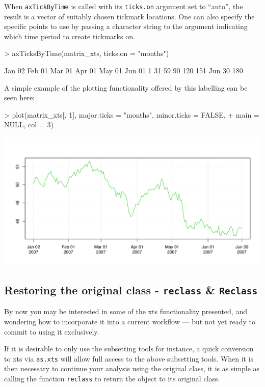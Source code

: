 \documentclass{article}
\begin{document}
When {\tt axTickByTime} is called with its
{\tt ticks.on} argument set to ``auto'', the result
is a vector of suitably chosen tickmark locations.
One can also specify the specific points to use
by passing a character string to the argument
indicating which time period to create tickmarks on.
\begin{Schunk}
\begin{Sinput}
> axTicksByTime(matrix_xts, ticks.on = "months")
\end{Sinput}
\begin{Soutput}
Jan 02 Feb 01 Mar 01 Apr 01 May 01 Jun 01 
           1           31           59           90          120          151 
Jun 30 
         180 
\end{Soutput}
\end{Schunk}
A simple example of the plotting functionality
offered by this labelling can be seen here:
\begin{center}
\begin{Schunk}
\begin{Sinput}
> plot(matrix_xts[, 1], major.ticks = "months", minor.ticks = FALSE, 
+     main = NULL, col = 3)
\end{Sinput}
\end{Schunk}
\includegraphics{xts-xtsplot}
\end{center}

\subsection{Restoring the original class - {\tt reclass} \& {\tt Reclass}}
By now you may be interested in some of the xts functionality
presented, and wondering how to incorporate it into
a current workflow --- but not yet ready to commit
to using it exclusively.

If it is desirable to only use the subsetting tools
for instance, a quick conversion to xts via {\tt as.xts}
will allow full access to the above subsetting tools. When
it is then necessary to continue your analysis using
the original class, it is as simple as calling the
function {\tt reclass} to return the object to its
original class.
\end{document}
